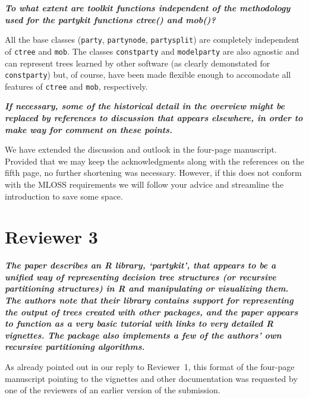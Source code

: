 \documentclass{article}
\begin{document}
\medskip

\textbf{\textit{%
To what extent are toolkit functions independent of
the methodology used for the partykit functions ctree() and mob()?
}}

\smallskip

All the base classes (\texttt{party}, \texttt{partynode}, \texttt{partysplit}) are
completely independent of \texttt{ctree} and \texttt{mob}. The classes
\texttt{constparty} and \texttt{modelparty} are also agnostic and can represent
trees learned by other software (as clearly demonstated for \texttt{constparty})
but, of course, have been made flexible enough to accomodate all features
of \texttt{ctree} and \texttt{mob}, respectively.

\medskip

\textbf{\textit{%
If necessary, some of the historical detail in the overview might be replaced
by references to discussion that appears elsewhere, in order to make way for
comment on these points.
}}

\smallskip

We have extended the discussion and outlook in the four-page manuscript. Provided
that we may keep the acknowledgments along with the references on the fifth page,
no further shortening was necessary. However, if this does not conform with the
MLOSS requirements we will follow your advice and streamline the introduction to
save some space.

\section*{Reviewer 3}

\textbf{\textit{%
The paper describes an R library, `partykit', that appears to be a unified
way of representing decision tree structures (or recursive partitioning
structures) in R and manipulating or visualizing them.  The authors note
that their library contains support for representing the output of trees
created with other packages, and the paper appears to function as a very
basic tutorial with links to very detailed R vignettes.  The package also
implements a few of the authors' own recursive partitioning algorithms.
}}

\smallskip

As already pointed out in our reply to Reviewer~1, this format of the
four-page manuscript pointing to the vignettes and other documentation was
requested by one of the reviewers of an earlier version of the submission.
\end{document}
